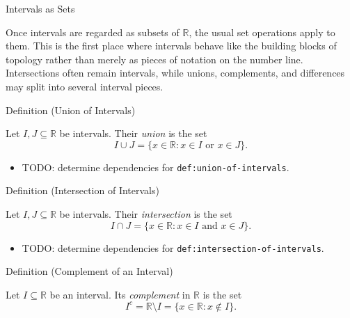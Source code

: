 \begin{topicbox}{Intervals as Sets}
\begin{exposition}
Once intervals are regarded as subsets of $\mathbb{R}$, the usual set
operations apply to them. This is the first place where intervals behave like
the building blocks of topology rather than merely as pieces of notation on
the number line. Intersections often remain intervals, while unions,
complements, and differences may split into several interval pieces.
\end{exposition}
\end{topicbox}

\begin{definitionbox}{Definition (Union of Intervals)}
\begin{definition}
\label{def:union-of-intervals}
Let $I,J\subseteq\mathbb{R}$ be intervals. Their \emph{union} is the set
\[
I\cup J=\{x\in\mathbb{R}:x\in I\text{ or }x\in J\}.
\]
\end{definition}
\end{definitionbox}

\begin{dependencies}
\begin{itemize}
  \item TODO: determine dependencies for \texttt{def:union-of-intervals}.
\end{itemize}
\end{dependencies}

\begin{definitionbox}{Definition (Intersection of Intervals)}
\begin{definition}
\label{def:intersection-of-intervals}
Let $I,J\subseteq\mathbb{R}$ be intervals. Their \emph{intersection} is the set
\[
I\cap J=\{x\in\mathbb{R}:x\in I\text{ and }x\in J\}.
\]
\end{definition}
\end{definitionbox}

\begin{dependencies}
\begin{itemize}
  \item TODO: determine dependencies for \texttt{def:intersection-of-intervals}.
\end{itemize}
\end{dependencies}

\begin{definitionbox}{Definition (Complement of an Interval)}
\begin{definition}
\label{def:complement-of-interval}
Let $I\subseteq\mathbb{R}$ be an interval. Its \emph{complement} in
$\mathbb{R}$ is the set
\[
I^{c}=\mathbb{R}\setminus I
=\{x\in\mathbb{R}:x\notin I\}.
\]
\end{definition}
\end{definitionbox}

